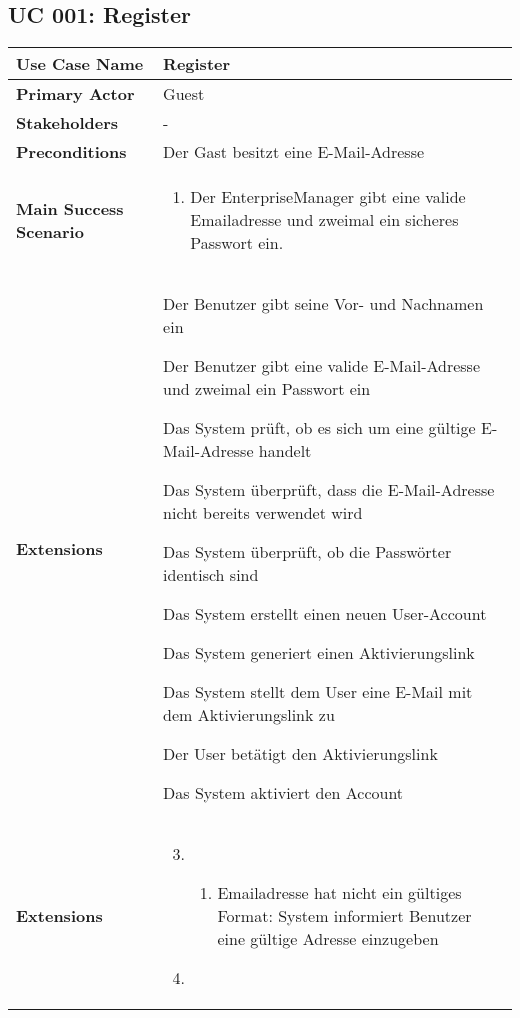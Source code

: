 \subsection{UC 001: Register}
\label{uc:001-register}

\begin{tabular}{|l|p{}|}
\hline
\textbf{Use Case Name} 	&	Register	\\ \hline
\textbf{Primary Actor} 	&	Guest	\\ \hline
\textbf{Stakeholders}	&	-	\\ \hline
\textbf{Preconditions}	&	Der Gast besitzt eine E-Mail-Adresse	\\ \hline
\textbf{Main Success Scenario}	& 	
\begin{enumerate}
	\item Der EnterpriseManager gibt eine valide Emailadresse und zweimal ein sicheres Passwort ein.
\end{enumerate}
\\ \hline
\textbf{Extensions}	&
	\item Der Benutzer gibt seine Vor- und Nachnamen ein
	\item Der Benutzer gibt eine valide E-Mail-Adresse und zweimal ein Passwort ein
	\item Das System prüft, ob es sich um eine gültige E-Mail-Adresse handelt
	\item Das System überprüft, dass die E-Mail-Adresse nicht bereits verwendet wird
	\item Das System überprüft, ob die Passwörter identisch sind
	\item Das System erstellt einen neuen User-Account
	\item Das System generiert einen Aktivierungslink 
	\item Das System stellt dem User eine E-Mail mit dem Aktivierungslink zu
	\item Der User betätigt den Aktivierungslink 
	\item Das System aktiviert den Account 
\end{enumerate}
\\ \hline
\textbf{Extensions}	& 	
\begin{enumerate}
\setcounter{enumi}{2}
\item 
\begin{enumerate}
\item Emailadresse hat nicht ein gültiges Format: System informiert Benutzer eine gültige Adresse einzugeben
\end{enumerate}
\item

\end{enumerate}
\end{tabular}
